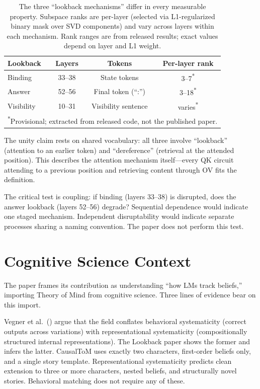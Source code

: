\documentclass[11pt]{article}
\begin{document}
\begin{table}[t]
\centering
\caption{The three ``lookback mechanisms'' differ in every measurable property. Subspace ranks are per-layer (selected via L1-regularized binary mask over SVD components) and vary across layers within each mechanism. Rank ranges are from released results; exact values depend on layer and L1 weight.}
\label{tab:unity}
\begin{tabular}{lccc}
\toprule
Lookback & Layers & Tokens & Per-layer rank \\
\midrule
Binding & 33--38 & State tokens & 3--7\textsuperscript{*} \\
Answer & 52--56 & Final token (``:'') & 3--18\textsuperscript{*} \\
Visibility & 10--31 & Visibility sentence & varies\textsuperscript{*} \\
\bottomrule
\multicolumn{4}{l}{\footnotesize \textsuperscript{*}Provisional; extracted from released code, not the published paper.}
\end{tabular}
\end{table}

The unity claim rests on shared vocabulary: all three involve ``lookback'' (attention to an earlier token) and ``dereference'' (retrieval at the attended position). This describes the attention mechanism itself---every QK circuit attending to a previous position and retrieving content through OV fits the definition.

The critical test is coupling: if binding (layers 33--38) is disrupted, does the answer lookback (layers 52--56) degrade? Sequential dependence would indicate one staged mechanism. Independent disruptability would indicate separate processes sharing a naming convention. The paper does not perform this test.


\section{Cognitive Science Context}
\label{sec:cogsci}

The paper frames its contribution as understanding ``how LMs track beliefs,'' importing Theory of Mind from cognitive science. Three lines of evidence bear on this import.

Vegner et al.\ (\citeyear{vegner2025systematicity}) argue that the field conflates behavioral systematicity (correct outputs across variations) with representational systematicity (compositionally structured internal representations). The Lookback paper shows the former and infers the latter. CausalToM uses exactly two characters, first-order beliefs only, and a single story template. Representational systematicity predicts clean extension to three or more characters, nested beliefs, and structurally novel stories. Behavioral matching does not require any of these.
\end{document}
